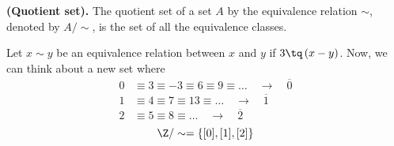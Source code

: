 \begin{definition}
    \textbf{(Quotient set).} The quotient set of a set $A$ by the equivalence relation $\sim$, denoted by $A / \sim$, is the set of all the equivalence classes.
\end{definition}
\begin{example}
    Let $x\sim y$ be an equivalence relation between $x$ and $y$ if $3\tq \left( x - y \right)$. Now, we can think about a new set where
    \begin{align}
        0&\equiv 3\equiv -3\equiv 6\equiv 9\equiv\ldots\quad\rightarrow\quad\overline{0} \\
        1&\equiv 4\equiv 7\equiv 13\equiv\ldots\quad\rightarrow\quad\overline{1} \\
        2&\equiv 5\equiv 8\equiv\ldots\quad\rightarrow\quad\overline{2}
    \end{align}
    \begin{equation}
        \Z / \sim = \{[0], [1], [2]\} 
    \end{equation}
\end{example}
